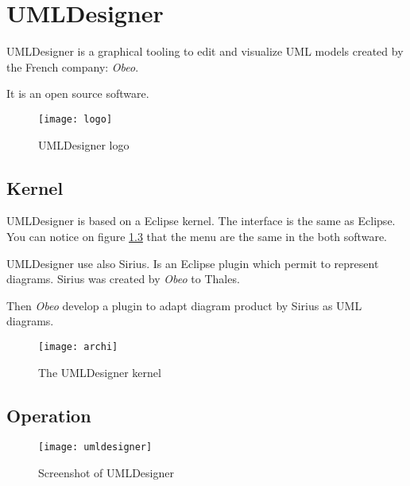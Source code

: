 
\chapter{UMLDesigner}
\label{chap:UMLDesigner}


UMLDesigner is a graphical tooling to edit and visualize UML models created by the French company: \textit{Obeo}.

It is an open source software.

\begin{figure}[h]
  \centering
  \texttt{[image: logo]}
  \caption{UMLDesigner logo}
  \label{fig:logo}
\end{figure}

\section{Kernel}

UMLDesigner is based on a Eclipse kernel. The interface is the same as Eclipse. You can notice on figure \ref{fig:umldesigner} that the menu are the same in the both software.

UMLDesigner use also Sirius. Is an Eclipse plugin which permit to represent diagrams. Sirius was created by \textit{Obeo} to Thales.

Then \textit{Obeo} develop a plugin to adapt diagram product by Sirius as UML diagrams.

\begin{figure}[h]
  \centering
  \texttt{[image: archi]}
  \caption{The UMLDesigner kernel}
  \label{fig:kernel}
\end{figure}

\newpage
\section{Operation}



\begin{figure}[h]
  \centering
  \texttt{[image: umldesigner]}
  \caption{Screenshot of UMLDesigner}
  \label{fig:umldesigner}
\end{figure}




